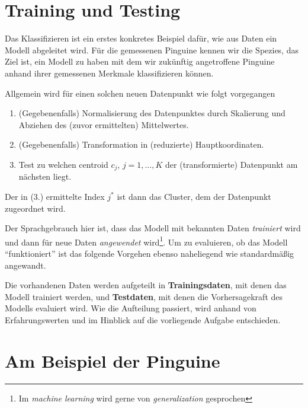 \documentclass[]{book}
\providecommand{\tightlist}{%
  \setlength{\itemsep}{0pt}\setlength{\parskip}{0pt}}
\theoremstyle{definition}
\theoremstyle{definition}
\theoremstyle{definition}
\theoremstyle{definition}
\theoremstyle{remark}
\begin{document}
\hypertarget{training-und-testing}{%
\section{Training und Testing}\label{training-und-testing}}

Das Klassifizieren ist ein erstes konkretes Beispiel dafür, wie aus Daten ein Modell abgeleitet wird. Für die gemessenen Pinguine kennen wir die Spezies, das Ziel ist, ein Modell zu haben mit dem wir zukünftig angetroffene Pinguine anhand ihrer gemessenen Merkmale klassifizieren können.

Allgemein wird für einen solchen neuen Datenpunkt wie folgt vorgegangen

\begin{enumerate}
\def\labelenumi{\arabic{enumi}.}
\tightlist
\item
  (Gegebenenfalls) Normalisierung des Datenpunktes durch Skalierung und Abziehen des (zuvor ermittelten) Mittelwertes.
\item
  (Gegebenenfalls) Transformation in (reduzierte) Hauptkoordinaten.
\item
  Test zu welchen centroid \(c_j\), \(j=1,\dots,K\) der (transformierte) Datenpunkt am nächsten liegt.
\end{enumerate}

Der in (3.) ermittelte Index \(j^*\) ist dann das Cluster, dem der Datenpunkt zugeordnet wird.

Der Sprachgebrauch hier ist, dass das Modell mit bekannten Daten \emph{trainiert} wird und dann für neue Daten \emph{angewendet} wird\footnote{Im \emph{machine learning} wird gerne von \emph{generalization} gesprochen}. Um zu evaluieren, ob das Modell ``funktioniert'' ist das folgende Vorgehen ebenso naheliegend wie standardmäßig angewandt.

Die vorhandenen Daten werden aufgeteilt in \textbf{Trainingsdaten}, mit denen das Modell trainiert werden, und \textbf{Testdaten}, mit denen die Vorhersagekraft des Modells evaluiert wird. Wie die Aufteilung passiert, wird anhand von Erfahrungswerten und im Hinblick auf die vorliegende Aufgabe entschieden.

\hypertarget{am-beispiel-der-pinguine}{%
\section{Am Beispiel der Pinguine}\label{am-beispiel-der-pinguine}}
\end{document}

